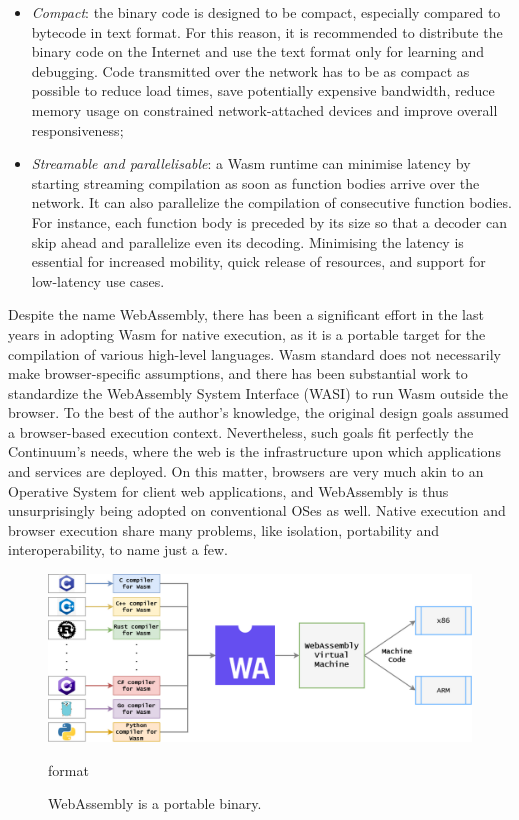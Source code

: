 \begin{itemize}
    \item \emph{Compact}: the binary code is designed to be compact, especially compared to bytecode in text format. For this reason, it is recommended to distribute the binary code on the Internet and use the text format only for learning and debugging. Code transmitted over the network has to be as compact as possible to reduce load times, save potentially expensive bandwidth, reduce memory usage on constrained network-attached devices and improve overall responsiveness;
    \item \emph{Streamable and parallelisable}: a Wasm runtime can minimise latency by starting streaming compilation as soon as function bodies arrive over the network. It can also parallelize the compilation of consecutive function bodies. For instance, each function body is preceded by its size so that a decoder can skip ahead and parallelize even its decoding. Minimising the latency is essential for increased mobility, quick release of resources, and support for low-latency use cases.
\end{itemize}

Despite the name WebAssembly, there has been a significant effort in the last years in adopting Wasm for native execution, as it is a portable target for the compilation of various high-level languages. Wasm standard does not necessarily make browser-specific assumptions, and there has been substantial work to standardize the WebAssembly System Interface (WASI) to run Wasm outside the browser. To the best of the author's knowledge, the original design goals assumed a browser-based execution context. Nevertheless, such goals fit perfectly the Continuum's needs, where the web is the infrastructure upon which applications and services are deployed. On this matter, browsers are very much akin to an Operative System for client web applications, and WebAssembly is thus unsurprisingly being adopted on conventional OSes as well. Native execution and browser execution share many problems, like isolation, portability and interoperability, to name just a few.

\begin{figure}[ht]
\centering
\includegraphics[width=\columnwidth]{figures/portability}
\caption{WebAssembly is a portable binary.} format \label{fig:portability}
\end{figure}

